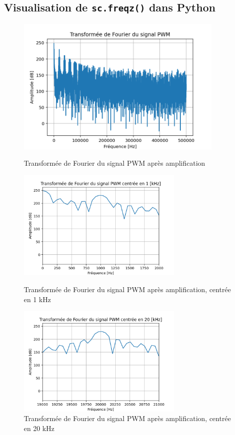 \documentclass[a4paper,12pt,oneside]{report}	%
\begin{document}
        \subsection{Visualisation de \texttt{sc.freqz()} dans Python}
            \begin{figure}[h!]
                \centering
                \includegraphics[width = 10cm]{code-projet-python/1.3.2 - Fourier transform of ampl_PWM.png}
                \caption{Transformée de Fourier du signal PWM après amplification}
                \label{fig:fourier_PWM_amp}
                
                \includegraphics[width = 8cm]{code-projet-python/1.3.2 - Fourier transform of ampl_PWM centered on 1000 Hz.png}
                \caption{Transformée de Fourier du signal PWM après amplification, centrée en 1 kHz}
                \label{fig:fourier_PWM_amp_1kHz}
                
                \includegraphics[width = 8cm]{code-projet-python/1.3.2 - Fourier transform of ampl_PWM centered on 20 000 Hz.png}
                \caption{Transformée de Fourier du signal PWM après amplification, centrée en 20 kHz}
                \label{fig:fourier_PWM_amp_20kHz}
            \end{figure}
\end{document}
